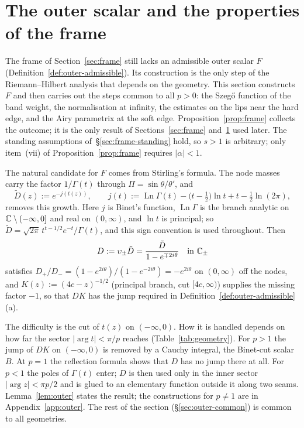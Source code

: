 
\section{The outer scalar and the properties of the frame}\label{sec:outer}

The frame of Section~\ref{sec:frame} still lacks an admissible outer scalar $F$
(Definition~\ref{def:outer-admissible}). Its construction is the only step of the Riemann--Hilbert analysis that
depends on the geometry. This section constructs $F$ and then carries out the steps common to all $p>0$: the Szeg\H{o} function of the band weight, the
normalisation at infinity, the estimates on the lips near the hard edge, and the Airy parametrix at the soft edge.
Proposition~\ref{prop:frame} collects the outcome; it is the only result of Sections~\ref{sec:frame}
and~\ref{sec:outer} used later. The standing assumptions of~\S\ref{sec:frame-standing} hold, so $s>1$ is arbitrary;
only item~(vii) of Proposition~\ref{prop:frame} requires $|\alpha|<1$.

The natural candidate for $F$ comes from Stirling's formula. The node masses carry the factor $1/\Gamma(t)$ through
$\Pi=\sin\theta/\theta'$, and
\[
  \tilde D(z):=e^{-j(t(z))},\qquad j(t):=\operatorname{Ln}\Gamma(t)-\bigl(t-\tfrac12\bigr)\ln t+t-\tfrac12\ln(2\pi),
\]
removes this growth. Here $j$ is Binet's function, $\operatorname{Ln}\Gamma$ is the branch analytic on
$\mathbb{C}\setminus(-\infty,0]$ and real on $(0,\infty)$, and $\ln t$ is principal; so
$\tilde D=\sqrt{2\pi}\,t^{t-1/2}e^{-t}/\Gamma(t)$, and this sign convention is used throughout. Then
\begin{equation}\label{eq:D}
  D:=\upsilon_\pm\tilde D=\frac{\tilde D}{1-e^{\mp2i\theta}}\quad\text{in }\mathbb{C}_\pm
\end{equation}
satisfies $D_+/D_-=(1-e^{2i\theta})/(1-e^{-2i\theta})=-e^{2i\theta}$ on $(0,\infty)$ off the nodes, and
$K(z):=(4c-z)^{-1/2}$ (principal branch, cut $[4c,\infty)$) supplies the missing factor $-1$, so that $DK$ has the
jump required in Definition~\ref{def:outer-admissible}(a).

The difficulty is the cut of $t(z)$ on $(-\infty,0)$. How it is handled depends on how far the sector
$|\arg t|<\pi/p$ reaches (Table~\ref{tab:geometry}). For $p>1$ the jump of $DK$ on $(-\infty,0)$ is removed by a
Cauchy integral, the Binet-cut scalar $B$. At $p=1$ the reflection formula shows that $D$ has no jump there at all.
For $p<1$ the poles of $\Gamma(t)$ enter; $D$ is then used only in the inner sector $|\arg z|<\pi p/2$ and is glued to
an elementary function outside it along two seams. Lemma~\ref{lem:outer} states the result; the constructions for $p\ne1$
are in Appendix~\ref{app:outer}. The rest of the section (\S\ref{sec:outer-common}) is common to all geometries.

